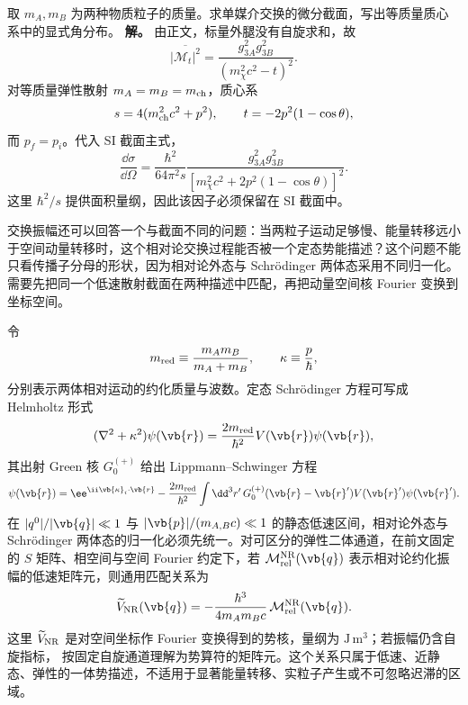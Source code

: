 \begin{exbox}[单媒介粒子交换的角分布]
取 $m_A,m_B$ 为两种物质粒子的质量。求单媒介交换的微分截面，写出等质量质心系中的显式角分布。
\textbf{解。} 由正文，标量外腿没有自旋求和，故
\begin{equation}
 {
 \overline{|\mathcal M_t|^2}
 =\frac{g_{3A}^2g_{3B}^2}{(m_\chi^2c^2-t)^2}.}
 \label{eq:scalar-exchange-M2-r10}
\end{equation}
对等质量弹性散射 $m_A=m_B=m_{\rm ch}$，质心系
\begin{equation*}
 s=4(m_{\rm ch}^2c^2+p^2),\qquad
 t=-2p^2(1-\cos\theta),
\end{equation*}
而 $p_f=p_i$。代入 SI 截面主式，
\begin{equation}
 {
 \frac{\dd\sigma}{\dd\Omega}
 =\frac{\hbar^2}{64\pi^2s}
 \frac{g_{3A}^2g_{3B}^2}
 {[m_\chi^2c^2+2p^2(1-\cos\theta)]^2}.}
 \label{eq:scalar-exchange-angular-r10}
\end{equation}
这里 $\hbar^2/s$ 提供面积量纲，因此该因子必须保留在 SI 截面中。
\end{exbox}

交换振幅还可以回答一个与截面不同的问题：当两粒子运动足够慢、能量转移远小于空间动量转移时，这个相对论交换过程能否被一个定态势能描述？这个问题不能只看传播子分母的形状，因为相对论外态与 Schr\"odinger 两体态采用不同归一化。需要先把同一个低速散射截面在两种描述中匹配，再把动量空间核 Fourier 变换到坐标空间。

令
\begin{equation*}
 m_{\rm red}\equiv\frac{m_A m_B}{m_A+m_B},
 \qquad
 \kappa\equiv\frac{p}{\hbar},
\end{equation*}
分别表示两体相对运动的约化质量与波数。定态 Schr\"odinger 方程可写成 Helmholtz 形式
\begin{equation}
 (\nabla^2+\kappa^2)\psi(\vb{r})
 =\frac{2m_{\rm red}}{\hbar^2}V(\vb{r})\psi(\vb{r}),
 \label{eq:sch-helmholtz-r13}
\end{equation}
其出射 Green 核 $G_0^{(+)}$ 给出 Lippmann--Schwinger 方程
\begin{equation}
 \psi(\vb{r})=\ee^{\ii\vb{\kappa}_i\cdot\vb{r}}
 -\frac{2m_{\rm red}}{\hbar^2}\int\dd^3 r'\,
 G_0^{(+)}(\vb{r}-\vb{r}')V(\vb{r}')\psi(\vb{r}').
 \label{eq:sch-lippmann-r13}
\end{equation}
在 $|q^0|/|\vb{q}|\ll1$ 与 $|\vb{p}|/(m_{A,B}c)\ll1$ 的静态低速区间，相对论外态与 Schr\"odinger 两体态的归一化必须先统一。对可区分的弹性二体通道，在前文固定的 $S$ 矩阵、相空间与空间 Fourier 约定下，若 $\mathcal M_{\rm rel}^{\rm NR}(\vb{q})$ 表示相对论约化振幅的低速矩阵元，则通用匹配关系为
\begin{equation}
{
\widetilde V_{\rm NR}(\vb{q})
=-\frac{\hbar^3}{4m_A m_Bc}\,
\mathcal M_{\rm rel}^{\rm NR}(\vb{q}).}
\label{eq:relativistic-to-nr-potential-matching-dp75}
\end{equation}
这里 $\widetilde V_{\rm NR}$ 是对空间坐标作 Fourier 变换得到的势核，量纲为 $\mathrm{J\,m^3}$；若振幅仍含自旋指标， 按固定自旋通道理解为势算符的矩阵元。这个关系只属于低速、近静态、弹性的一体势描述，不适用于显著能量转移、实粒子产生或不可忽略迟滞的区域。

